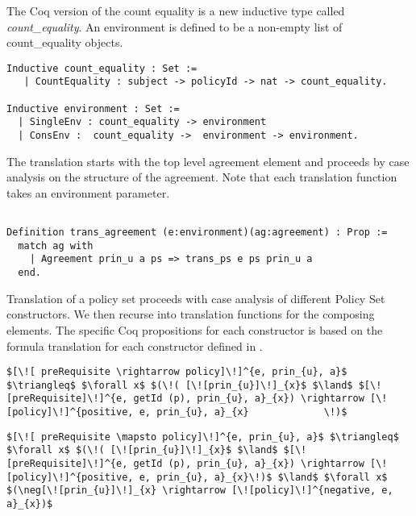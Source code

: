 The Coq version of the count equality is a new inductive type called \emph{count_equality}. An environment is defined to be a non-empty list of count_equality objects.

\begin{lstlisting}
Inductive count_equality : Set := 
   | CountEquality : subject -> policyId -> nat -> count_equality.

Inductive environment : Set := 
  | SingleEnv : count_equality -> environment
  | ConsEnv :  count_equality ->  environment -> environment.

\end{lstlisting}


The translation starts with the top level agreement element and proceeds by case analysis on the structure of the agreement. Note that each translation function takes an environment parameter.


\begin{lstlisting}

Definition trans_agreement (e:environment)(ag:agreement) : Prop :=
  match ag with 
    | Agreement prin_u a ps => trans_ps e ps prin_u a
  end.

\end{lstlisting}

Translation of a policy set proceeds with case analysis of different Policy Set constructors. We then recurse into translation functions for the composing elements. The specific Coq propositions for each constructor is based on the formula translation for each constructor defined in \cite{pucella2006}.

\lstset{mathescape, language=AST}  
\begin{lstlisting}[frame=single, caption={Policy Set Translation {$\colon$} PrimitivePolicySet},label={lst:transpolicyformulaPrimitivePolicySet}]
$[\![ preRequisite \rightarrow policy]\!]^{e, prin_{u}, a}$ $\triangleq$ $\forall x$ $(\!( [\![prin_{u}]\!]_{x}$ $\land$ $[\![preRequisite]\!]^{e, getId (p), prin_{u}, a}_{x}) \rightarrow [\![policy]\!]^{positive, e, prin_{u}, a}_{x}             \!)$
\end{lstlisting}

\lstset{mathescape, language=AST}  
\begin{lstlisting}[frame=single, caption={Policy Set Translation {$\colon$} PrimitiveExclusivePolicySet},label={lst:transpolicyformulaPrimitiveExclusivePolicySet}]
$[\![ preRequisite \mapsto policy]\!]^{e, prin_{u}, a}$ $\triangleq$ $\forall x$ $(\!( [\![prin_{u}]\!]_{x}$ $\land$ $[\![preRequisite]\!]^{e, getId (p), prin_{u}, a}_{x}) \rightarrow [\![policy]\!]^{positive, e, prin_{u}, a}_{x}\!)$ $\land$ $\forall x$ $(\neg[\![prin_{u}]\!]_{x} \rightarrow [\![policy]\!]^{negative, e, a}_{x})$

\end{lstlisting}


